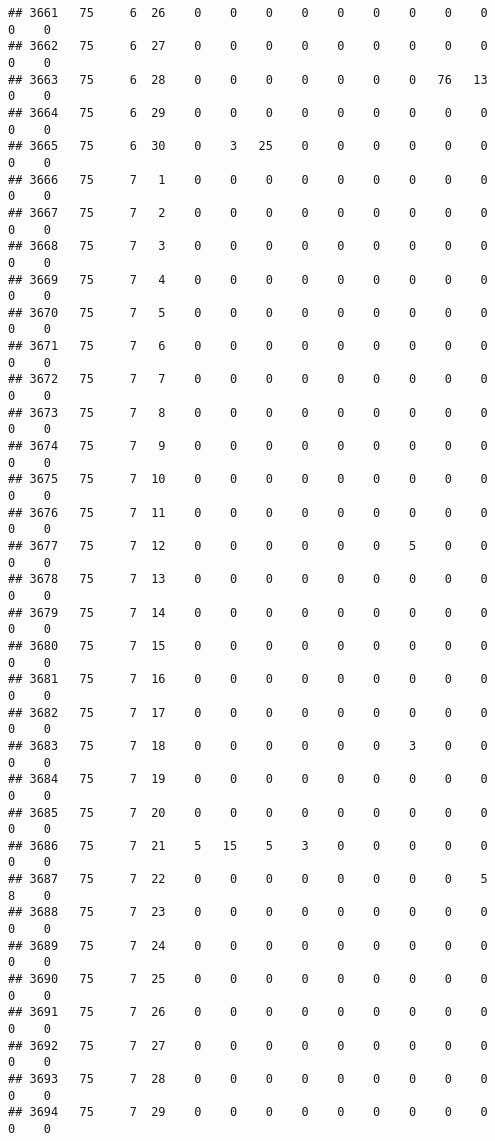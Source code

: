 \documentclass[]{article}
\begin{document}
\begin{verbatim}
## 3661   75     6  26    0    0    0    0    0    0    0    0    0    0    0
## 3662   75     6  27    0    0    0    0    0    0    0    0    0    0    0
## 3663   75     6  28    0    0    0    0    0    0    0   76   13    0    0
## 3664   75     6  29    0    0    0    0    0    0    0    0    0    0    0
## 3665   75     6  30    0    3   25    0    0    0    0    0    0    0    0
## 3666   75     7   1    0    0    0    0    0    0    0    0    0    0    0
## 3667   75     7   2    0    0    0    0    0    0    0    0    0    0    0
## 3668   75     7   3    0    0    0    0    0    0    0    0    0    0    0
## 3669   75     7   4    0    0    0    0    0    0    0    0    0    0    0
## 3670   75     7   5    0    0    0    0    0    0    0    0    0    0    0
## 3671   75     7   6    0    0    0    0    0    0    0    0    0    0    0
## 3672   75     7   7    0    0    0    0    0    0    0    0    0    0    0
## 3673   75     7   8    0    0    0    0    0    0    0    0    0    0    0
## 3674   75     7   9    0    0    0    0    0    0    0    0    0    0    0
## 3675   75     7  10    0    0    0    0    0    0    0    0    0    0    0
## 3676   75     7  11    0    0    0    0    0    0    0    0    0    0    0
## 3677   75     7  12    0    0    0    0    0    0    5    0    0    0    0
## 3678   75     7  13    0    0    0    0    0    0    0    0    0    0    0
## 3679   75     7  14    0    0    0    0    0    0    0    0    0    0    0
## 3680   75     7  15    0    0    0    0    0    0    0    0    0    0    0
## 3681   75     7  16    0    0    0    0    0    0    0    0    0    0    0
## 3682   75     7  17    0    0    0    0    0    0    0    0    0    0    0
## 3683   75     7  18    0    0    0    0    0    0    3    0    0    0    0
## 3684   75     7  19    0    0    0    0    0    0    0    0    0    0    0
## 3685   75     7  20    0    0    0    0    0    0    0    0    0    0    0
## 3686   75     7  21    5   15    5    3    0    0    0    0    0    0    0
## 3687   75     7  22    0    0    0    0    0    0    0    0    5    8    0
## 3688   75     7  23    0    0    0    0    0    0    0    0    0    0    0
## 3689   75     7  24    0    0    0    0    0    0    0    0    0    0    0
## 3690   75     7  25    0    0    0    0    0    0    0    0    0    0    0
## 3691   75     7  26    0    0    0    0    0    0    0    0    0    0    0
## 3692   75     7  27    0    0    0    0    0    0    0    0    0    0    0
## 3693   75     7  28    0    0    0    0    0    0    0    0    0    0    0
## 3694   75     7  29    0    0    0    0    0    0    0    0    0    0    0

\end{verbatim}
\end{document}
